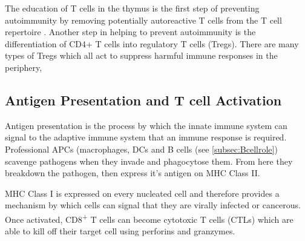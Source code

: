 The education of T cells in the thymus is the first step of preventing autoimmunity by removing potentially autoreactive T cells from the T cell repertoire \citep{Walker2002}.
Another step in helping to prevent autoimmunity is the differentiation of CD4+ T cells into regulatory T cells (Tregs).
There are many types of Tregs which all act to suppress harmful immune responses in the periphery,  


\subsection{Antigen Presentation and T cell Activation}
\label{subsec:Tcellactivation}


Antigen presentation is the process by which the innate immune system can signal to the adaptive immune system that an immune response is required.
Professional APCs (macrophages, DCs and B cells (see \cref{subsec:Bcellrole}) scavenge pathogens when they invade and phagocytose them.
From here they breakdown the pathogen, then express it's antigen on MHC Class II.

MHC Class I is expressed on every nucleated cell and therefore provides a mechanism by which cells can signal that they are virally infected or cancerous.
Once activated, CD8\textsuperscript{+} T cells can become cytotoxic T cells (CTLs) which are able to kill off their target cell using perforins and granzymes.

